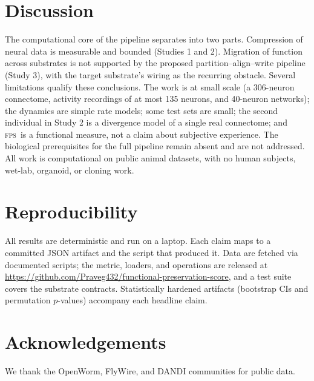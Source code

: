 \documentclass[11pt]{article}
\newcommand{\fps}{\textsc{fps}}
\begin{document}
\section{Discussion}
The computational core of the pipeline separates into two parts. Compression of neural data is
measurable and bounded (Studies 1 and 2). Migration of function across substrates is not supported
by the proposed partition--align--write pipeline (Study 3), with the target substrate's wiring as
the recurring obstacle. Several limitations qualify these conclusions. The work is at small scale
(a 306-neuron connectome, activity recordings of at most 135 neurons, and 40-neuron networks);
the dynamics are simple rate models; some test sets are small; the second individual in Study 2 is
a divergence model of a single real connectome; and \fps\ is a functional measure, not a claim
about subjective experience. The biological prerequisites for the full pipeline remain absent and
are not addressed. All work is computational on public animal datasets, with no human subjects,
wet-lab, organoid, or cloning work.

\section{Reproducibility}\label{sec:repro}
All results are deterministic and run on a laptop. Each claim maps to a committed JSON artifact and
the script that produced it. Data are fetched via documented scripts; the metric, loaders, and
operations are released at \url{https://github.com/Praveg432/functional-preservation-score}, and a
test suite covers the substrate contracts. Statistically hardened artifacts (bootstrap CIs and
permutation $p$-values) accompany each headline claim.

\section*{Acknowledgements}
We thank the OpenWorm, FlyWire, and DANDI communities for public data.



\end{document}
